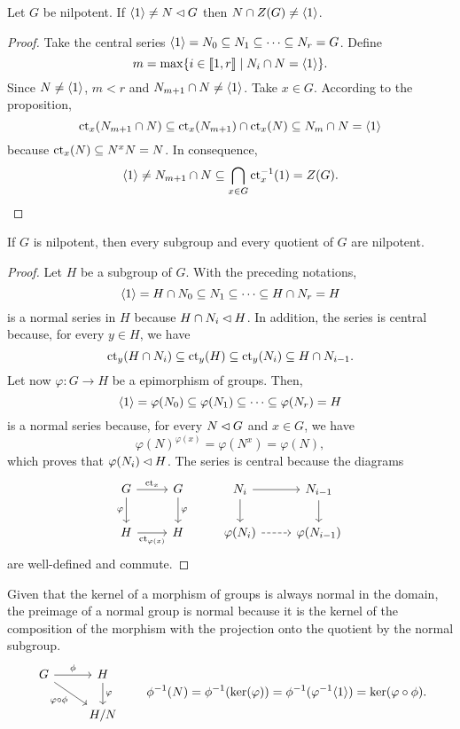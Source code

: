 \begin{cor}\label{normal-nilpotent-center}
    Let\/ $G$ be nilpotent. If\/ $\langle1\rangle\ne N\lhd G$ then\/ $N\cap Z(G)\ne\langle1\rangle$.
\end{cor}

\begin{proof} Take the central series $\langle1\rangle=N_0\subseteq N_1\subseteq\cdots\subseteq N_r=G$. Define
$$
    m = \max\{i\in\llbracket1,r\rrbracket\mid N_i\cap N=\langle1\rangle\}.
$$
Since $N\ne\langle1\rangle$, $m<r$ and $N_{m+1}\cap N\ne\langle1\rangle$. Take $x\in G$. According to the proposition,
$$
    \operatorname{\operatorname{ct}}_x(N_{m+1}\cap N)\subseteq\operatorname{\operatorname{ct}}_x(N_{m+1})\cap\operatorname{\operatorname{ct}}_x(N)\subseteq N_m\cap N
        =\langle1\rangle
$$
because $\operatorname{\operatorname{ct}}_x(N)\subseteq N^xN=N$. In consequence,
$$
    \langle1\rangle\ne N_{m+1}\cap N \subseteq\bigcap_{x\in G}\operatorname{\operatorname{ct}}_x^{-1}(1)=Z(G).
$$
 \end{proof}



\begin{cor}\label{nilpotent-subgroups-and-quotients}
    If\/ $G$ is nilpotent, then every subgroup and every quotient of\/ $G$ are nilpotent.
\end{cor}

\begin{proof} Let $H$ be a subgroup of $G$. With the preceding notations,
$$
    \langle1\rangle=H\cap N_0\subseteq N_1\subseteq\cdots\subseteq H\cap N_r=H
$$
is a normal series in $H$ because $H\cap N_i\lhd H$. In addition, the series is central because, for every $y\in H$, we have
$$
    \operatorname{\operatorname{ct}}_y(H\cap N_i)\subseteq\operatorname{\operatorname{ct}}_y(H)\subseteq\operatorname{\operatorname{ct}}_y(N_i)\subseteq H\cap N_{i-1}.
$$
Let now $\varphi\colon G\to H$ be a epimorphism of groups. Then,
$$
    \langle1\rangle=\varphi(N_0)\subseteq\varphi(N_1)\subseteq\cdots\subseteq\varphi(N_r)=H
$$
is a normal series because, for every $N\lhd G$ and $x\in G$, we have
$$
    \varphi(N)^{\varphi(x)}=\varphi(N^x)=\varphi(N),
$$
which proves that $\varphi(N_i)\lhd H$. The series is central because the diagrams
$$
    \begin{tikzcd}
        G \arrow[r, "\ct_x"] \arrow[d, "\varphi"'] & G \arrow[d, "\varphi"] & N_i \arrow[r] \arrow[d] & N_{i-1} \arrow[d] \\
        H \arrow[r, "\ct_{\varphi(x)}"'] & H & \varphi(N_i) \arrow[r, dashed] & \varphi(N_{i-1}) 
    \end{tikzcd}
$$
are well-defined and commute.  \end{proof}

\begin{rem}\label{preimage-of-normal}
    Given that the kernel of a morphism of groups is always normal in the domain, the preimage of a normal group is normal because it is the kernel of the composition of the morphism with the projection onto the quotient by the normal subgroup.
    $$
        \begin{tikzcd}
            G \arrow[r,"\phi"] \arrow[rd,"\varphi\circ\phi"'] & H \arrow[d,"\varphi"] \\
            & H/N
        \end{tikzcd}\qquad \phi^{-1}(N)=\phi^{-1}(\ker(\varphi))=\phi^{-1}(\varphi^{-1}\gen1)=\ker(\varphi\circ\phi).
    $$
\end{rem}

